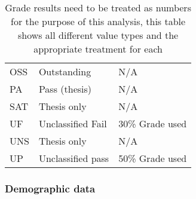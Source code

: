 \begin{table}[H]
\begin{tabular}{|l|l|l|}
        OSS                                   & Outstanding                           & N/A                                          \\
        PA                                    & Pass (thesis)                         & N/A                                          \\
        SAT                                   & Thesis only                           & N/A                                          \\
        UF                                    & Unclassified Fail                     & 30\% Grade used                              \\
        UNS                                   & Thesis only                           & N/A                                          \\
        UP                                    & Unclassified pass                     & 50\% Grade used                              \\
        \hline
    \end{tabular}
    \caption{Grade results need to be treated as numbers for the purpose of this analysis, this table shows all different value types and the appropriate treatment for each}
\end{table}

\subsubsection{Demographic data}
\label{appendix:demographic-data}


